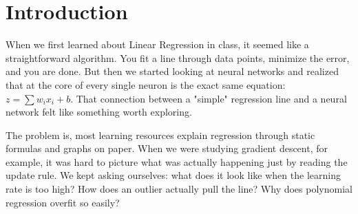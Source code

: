 \documentclass[12pt, a4paper]{article}
\begin{document}
\newpage

\begin{abstract}
In this project, we wanted to find a way to explain Linear Regression in a way that actually makes sense to someone seeing it for the first time. Instead of writing another textbook-style explanation, we decided to build an interactive website called \textbf{LinearMind} where users can play with the math themselves. The platform lets you click on a canvas to place data points, watch gradient descent optimize the line in real time, adjust the learning rate and see what happens, and even chat with an AI tutor powered by Google Gemini if you get stuck. We included 15 different visualizations, a 13-module curriculum with 29 lessons, 83 quiz questions, and a progress system with XP and achievements to keep things engaging. The whole thing is built with Next.js, React, and Firebase. Most importantly, we use the platform to show that a single neuron ($y = \mathbf{w}^T\mathbf{x} + b$) is really just linear regression with extra steps, which we think is a useful insight for anyone starting out with neural networks.
\end{abstract}

\newpage

\section{Introduction}

When we first learned about Linear Regression in class, it seemed like a straightforward algorithm. You fit a line through data points, minimize the error, and you are done. But then we started looking at neural networks and realized that at the core of every single neuron is the exact same equation: $z = \sum w_i x_i + b$. That connection between a "simple" regression line and a neural network felt like something worth exploring.

The problem is, most learning resources explain regression through static formulas and graphs on paper. When we were studying gradient descent, for example, it was hard to picture what was actually happening just by reading the update rule. We kept asking ourselves: what does it look like when the learning rate is too high? How does an outlier actually pull the line? Why does polynomial regression overfit so easily?
\end{document}
